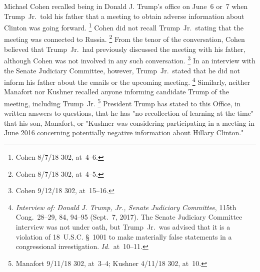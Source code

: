 Michael Cohen recalled being in Donald J. Trump's office on June~6 or~7 when Trump~Jr.\ told his father that a meeting to obtain adverse information about Clinton was going forward.%
\footnote{Cohen 8/7/18 302, at~4--6.}
Cohen did not recall Trump~Jr.\ stating that the meeting was connected to Russia.%
\footnote{Cohen 8/7/18 302, at~4--5.}
From the tenor of the conversation, Cohen believed that Trump~Jr.\ had previously discussed the meeting with his father, although Cohen was not involved in any such conversation.%
\footnote{Cohen 9/12/18 302, at~15--16.}
In an interview with the Senate Judiciary Committee, however, Trump~Jr.\ stated that he did not inform his father about the emails or the upcoming meeting.%
\footnote{\textit{Interview of: Donald J. Trump, Jr., Senate Judiciary Committee}, 115th Cong.~28--29, 84, 94--95
(Sept.~7, 2017).
The Senate Judiciary Committee interview was not under oath, but Trump~Jr.\ was advised that it is a violation of 18~U.S.C. \S~1001 to make materially false statements in a congressional investigation.
\textit{Id.}~at~10--11.}
Similarly, neither Manafort nor Kushner recalled anyone informing candidate Trump of the meeting, including Trump~Jr.%
\footnote{Manafort 9/11/18 302, at~3--4;
Kushner 4/11/18 302, at~10.}
President Trump has stated to this Office, in written answers to questions, that he has "no recollection of learning at the time" that his son, Manafort, or "Kushner was considering participating in a meeting in June 2016 concerning potentially negative information about Hillary Clinton."%
